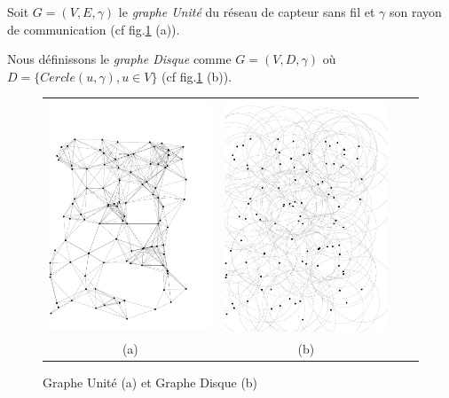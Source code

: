 \begin{mydef}
 Soit $G= (V,E,\gamma)$ le \textit{graphe Unité} du réseau de capteur sans fil et $\gamma$ son rayon de communication (cf fig.\ref{Unit} (a)).
\end{mydef}
\begin{mydef}
Nous définissons le \textit{graphe Disque} comme $G= (V,D,\gamma)$ où $D=\{ Cercle(u,\gamma), u\in V\}$ (cf fig.\ref{Unit} (b)).
\end{mydef}


\begin{figure}[tb]
    \centering
    \begin{tabular}{cccc}
      
      \includegraphics[angle=90, scale= 0.5,width=.5\linewidth]{Etat_de_l'art/source/GrapheUnit.pdf} &
      \includegraphics[angle=90, scale= 0.5,width=.5\linewidth]{Etat_de_l'art/source/GrapheUnitDisk.pdf} 
   \\
      (a) & (b) \\
    \end{tabular}
    \caption{Graphe Unité (a) et Graphe Disque (b) \label{Unit}}
\end{figure}

